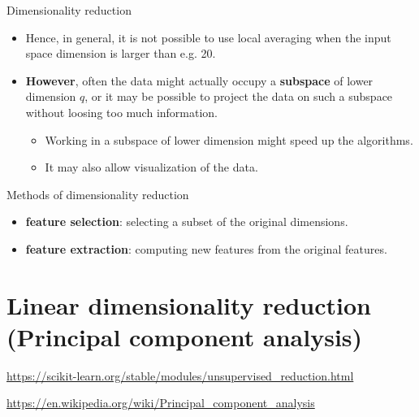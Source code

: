 \documentclass[usenames,dvipsnames]{beamer}
\begin{document}
\begin{frame}{Dimensionality reduction}
    \begin{itemize}
	\item Hence, in general, it is not possible to use local averaging when the input space dimension is larger than e.g. 20.
	\item \textbf{{However}}, often the data might actually occupy a \textbf{{subspace}} of lower dimension $q$, or it may be possible to project the data on such a subspace without loosing too much information.
	    \begin{itemize}
		\item Working in a subspace of lower dimension might speed up the algorithms.
		    \item It may also allow visualization of the data.
	    \end{itemize}
    \end{itemize}
\end{frame}

\begin{frame}{Methods of dimensionality reduction}
    \begin{itemize}
        \item \textbf{{feature selection}}: selecting a subset of the original dimensions.
	\item \textbf{{feature extraction}}: computing new features from the original features.
    \end{itemize}
\end{frame}




\section{Linear dimensionality reduction (Principal component analysis)}
\frame{\tableofcontents[currentsection]}

\begin{frame}

    \url{https://scikit-learn.org/stable/modules/unsupervised_reduction.html} 

    \url{https://en.wikipedia.org/wiki/Principal_component_analysis} 

\end{frame}
\end{document}
